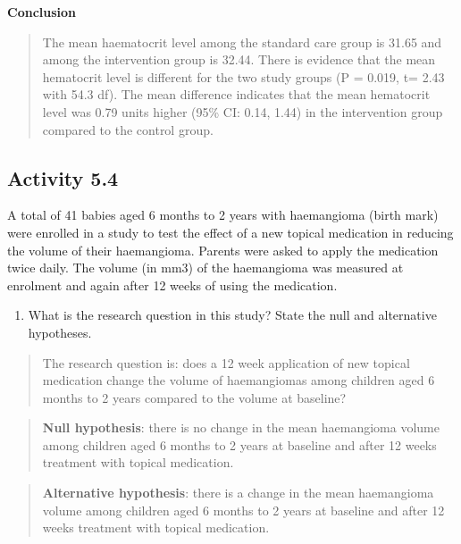 \documentclass[
]{memoir}
\providecommand{\tightlist}{%
  \setlength{\itemsep}{0pt}\setlength{\parskip}{0pt}}
\begin{document}
\textbf{Conclusion}

\begin{quote}
The mean haematocrit level among the standard care group is 31.65 and among the intervention group is 32.44. There is evidence that the mean hematocrit level is different for the two study groups (P = 0.019, t= 2.43 with 54.3 df). The mean difference indicates that the mean hematocrit level was 0.79 units higher (95\% CI: 0.14, 1.44) in the intervention group compared to the control group.
\end{quote}

\hypertarget{activity-5.4}{%
\subsection*{Activity 5.4}\label{activity-5.4}}

A total of 41 babies aged 6 months to 2 years with haemangioma (birth mark) were enrolled in a study to test the effect of a new topical medication in reducing the volume of their haemangioma. Parents were asked to apply the medication twice daily. The volume (in mm3) of the haemangioma was measured at enrolment and again after 12 weeks of using the medication.

\begin{enumerate}
\def\labelenumi{\alph{enumi})}
\tightlist
\item
  What is the research question in this study? State the null and alternative hypotheses.
\end{enumerate}

\begin{quote}
The research question is: does a 12 week application of new topical medication change the volume of haemangiomas among children aged 6 months to 2 years compared to the volume at baseline?
\end{quote}

\begin{quote}
\textbf{Null hypothesis}: there is no change in the mean haemangioma volume among children aged 6 months to 2 years at baseline and after 12 weeks treatment with topical medication.
\end{quote}

\begin{quote}
\textbf{Alternative hypothesis}: there is a change in the mean haemangioma volume among children aged 6 months to 2 years at baseline and after 12 weeks treatment with topical medication.
\end{quote}
\end{document}
